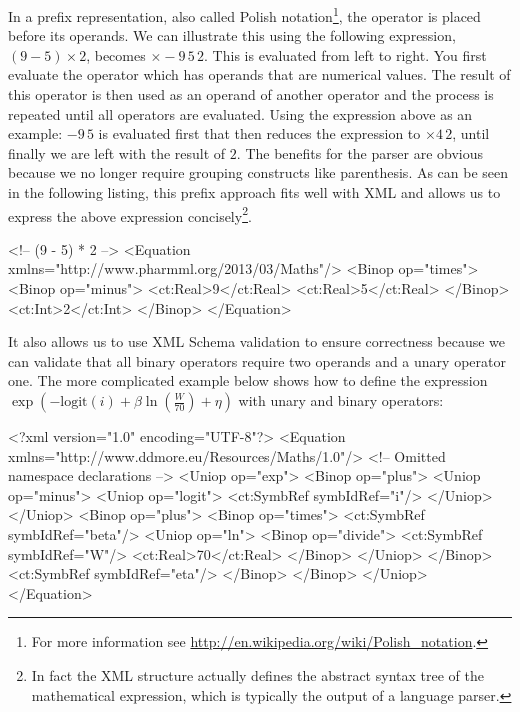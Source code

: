 
In a prefix representation, also called Polish notation\footnote{For
  more information see
  \url{http://en.wikipedia.org/wiki/Polish_notation}.}, the operator is
placed before its operands. We can illustrate this using the following
expression, $(9 - 5) \times 2$, becomes $\times-9\,5\,2$. This is
evaluated from left to right. You first evaluate the operator which
has operands that are numerical values. The result of this operator is
then used as an operand of another operator and the process is
repeated until all operators are evaluated. Using the expression above
as an example: $-9\,5$ is evaluated first that then reduces the
expression to $\times 4\,2$, until finally we are left with the result
of $2$. The benefits for the parser are obvious because we no longer
require grouping constructs like parenthesis. As can be seen in the
following listing, this prefix approach fits well with XML and allows
us to express the above expression concisely\footnote{In fact the XML
  structure actually defines the abstract syntax tree of the
  mathematical expression, which is typically the output of a language
  parser.}.
%
\begin{xmlcode}
<!-- (9 - 5) * 2 -->
<Equation xmlns="http://www.pharmml.org/2013/03/Maths"/>
    <Binop op="times">
        <Binop op="minus">
            <ct:Real>9</ct:Real>
            <ct:Real>5</ct:Real>
        </Binop>
        <ct:Int>2</ct:Int>
    </Binop>
</Equation>
\end{xmlcode}
%
It also allows us to use XML Schema validation to ensure correctness
because we can validate that all binary operators require two operands
and a unary operator one. The more complicated example below shows how
to define the expression $\exp\left(-\textrm{logit}(i) + \beta
  \ln\left(\frac{W}{70}\right)+\eta\right)$ with unary and binary
operators:
\begin{xmlcode}
<?xml version="1.0" encoding="UTF-8"?>
<Equation xmlns="http://www.ddmore.eu/Resources/Maths/1.0"/>
    <!-- Omitted namespace declarations -->
    <Uniop op="exp">
        <Binop op="plus">
            <Uniop op="minus">
                <Uniop op="logit">
                    <ct:SymbRef symbIdRef="i"/>
                </Uniop>
            </Uniop>
            <Binop op="plus">
                <Binop op="times">
                    <ct:SymbRef symbIdRef="beta"/>
                    <Uniop op="ln">
                        <Binop op="divide">
                            <ct:SymbRef symbIdRef="W"/>
                            <ct:Real>70</ct:Real>
                        </Binop>
                    </Uniop>
                </Binop>
                <ct:SymbRef symbIdRef="eta"/>
            </Binop>
        </Binop>
    </Uniop>
</Equation>
\end{xmlcode}

